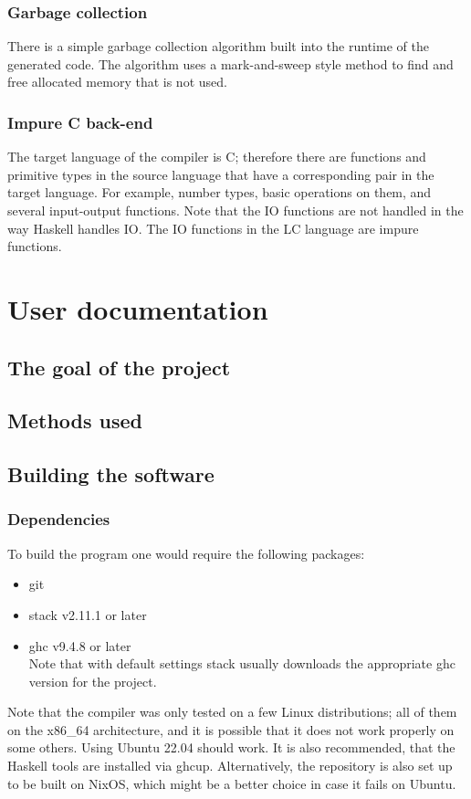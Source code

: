 \documentclass[12pt]{article}
\begin{document}
\subsubsection{Garbage collection} %

There is a simple garbage collection algorithm built into the runtime of the
generated code. The algorithm uses a mark-and-sweep style method to find and
free allocated memory that is not used.

\subsubsection{Impure C back-end} %

The target language of the compiler is C; therefore there are functions and
primitive types in the source language that have a corresponding pair in the
target language. For example, number types, basic operations on them, and
several input-output functions. Note that the IO functions are not handled in
the way Haskell handles IO. The IO functions in the LC language are impure
functions.

\pagebreak
\section{User documentation}

\subsection{The goal of the project} %
\subsection{Methods used} %

\subsection{Building the software}
\subsubsection{Dependencies}

To build the program one would require the following packages:
\begin{itemize}
    \item git
    \item stack v2.11.1 or later
    \item ghc v9.4.8 or later \\ Note that with default settings stack usually
        downloads the appropriate ghc version for the project.
\end{itemize}
Note that the compiler was only tested on a few Linux distributions; all of them
on the x86\_64 architecture, and it is possible that it does not work properly
on some others. Using Ubuntu 22.04 should work. It is also recommended, that the
Haskell tools are installed via ghcup. Alternatively, the repository is also set
up to be built on NixOS, which might be a better choice in case it fails on
Ubuntu.
\end{document}
